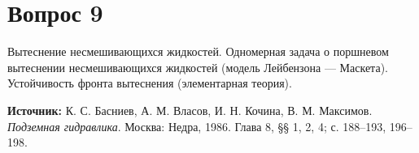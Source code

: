 \documentclass[12pt,a4paper]{article}
\begin{document}
\section*{Вопрос 9}
Вытеснение несмешивающихся жидкостей. Одномерная задача о поршневом вытеснении несмешивающихся жидкостей (модель Лейбензона — Маскета). Устойчивость фронта вытеснения (элементарная теория).

\medskip
\noindent\textbf{Источник:} К. С. Басниев, А. М. Власов, И. Н. Кочина, В. М. Максимов. \textit{Подземная гидравлика}. Москва: Недра, 1986. Глава 8, §§ 1, 2, 4; с. 188--193, 196--198.
\par\bigskip

\end{document}
